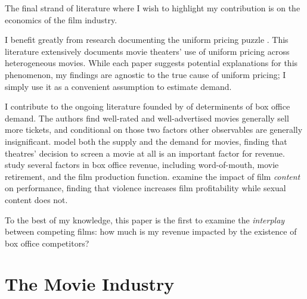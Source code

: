 \documentclass{article}
\begin{document}
The final strand of literature where I wish to highlight my contribution is on the economics of the film industry. 

I benefit greatly from research documenting the uniform pricing puzzle \parencite{orbach2007IRLE, gil2009MS, ho2018MR}. This literature extensively documents movie theaters' use of uniform pricing across heterogeneous movies. While each paper suggests potential explanations for this phenomenon, my findings are agnostic to the true cause of uniform pricing; I simply use it as a convenient assumption to estimate demand.

I contribute to the ongoing literature founded by \textcite{prag1994CE} of determinents of box office demand. The authors find well-rated and well-advertised movies generally sell more tickets, and conditional on those two factors other observables are generally insignificant. \textcite{elberse2003MS} model both the supply and the demand for movies, finding that theatres' decision to screen a movie at all is an important factor for revenue. \textcite{devany1996E, devany1997EI, devany1999JCE, devany2004EDC} study several factors in box office revenue, including word-of-mouth, movie retirement, and the film production function. \textcite{ravid2004B} examine the impact of film \emph{content} on performance, finding that violence increases film profitability while sexual content does not. 

To the best of my knowledge, this paper is the first to examine the \emph{interplay} between competing films: how much is my revenue impacted by the existence of box office competitors?


\section{The Movie Industry}
\end{document}
